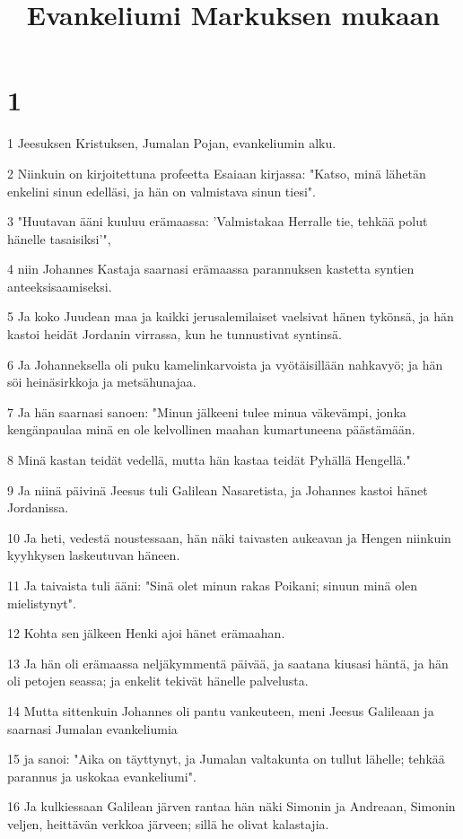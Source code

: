 

\title{Evankeliumi Markuksen mukaan}


\chapter{1}

\par 1 Jeesuksen Kristuksen, Jumalan Pojan, evankeliumin alku.
\par 2 Niinkuin on kirjoitettuna profeetta Esaiaan kirjassa: "Katso, minä lähetän enkelini sinun edelläsi, ja hän on valmistava sinun tiesi".
\par 3 "Huutavan ääni kuuluu erämaassa: 'Valmistakaa Herralle tie, tehkää polut hänelle tasaisiksi'",
\par 4 niin Johannes Kastaja saarnasi erämaassa parannuksen kastetta syntien anteeksisaamiseksi.
\par 5 Ja koko Juudean maa ja kaikki jerusalemilaiset vaelsivat hänen tykönsä, ja hän kastoi heidät Jordanin virrassa, kun he tunnustivat syntinsä.
\par 6 Ja Johanneksella oli puku kamelinkarvoista ja vyötäisillään nahkavyö; ja hän söi heinäsirkkoja ja metsähunajaa.
\par 7 Ja hän saarnasi sanoen: "Minun jälkeeni tulee minua väkevämpi, jonka kengänpaulaa minä en ole kelvollinen maahan kumartuneena päästämään.
\par 8 Minä kastan teidät vedellä, mutta hän kastaa teidät Pyhällä Hengellä."
\par 9 Ja niinä päivinä Jeesus tuli Galilean Nasaretista, ja Johannes kastoi hänet Jordanissa.
\par 10 Ja heti, vedestä noustessaan, hän näki taivasten aukeavan ja Hengen niinkuin kyyhkysen laskeutuvan häneen.
\par 11 Ja taivaista tuli ääni: "Sinä olet minun rakas Poikani; sinuun minä olen mielistynyt".
\par 12 Kohta sen jälkeen Henki ajoi hänet erämaahan.
\par 13 Ja hän oli erämaassa neljäkymmentä päivää, ja saatana kiusasi häntä, ja hän oli petojen seassa; ja enkelit tekivät hänelle palvelusta.
\par 14 Mutta sittenkuin Johannes oli pantu vankeuteen, meni Jeesus Galileaan ja saarnasi Jumalan evankeliumia
\par 15 ja sanoi: "Aika on täyttynyt, ja Jumalan valtakunta on tullut lähelle; tehkää parannus ja uskokaa evankeliumi".
\par 16 Ja kulkiessaan Galilean järven rantaa hän näki Simonin ja Andreaan, Simonin veljen, heittävän verkkoa järveen; sillä he olivat kalastajia.

